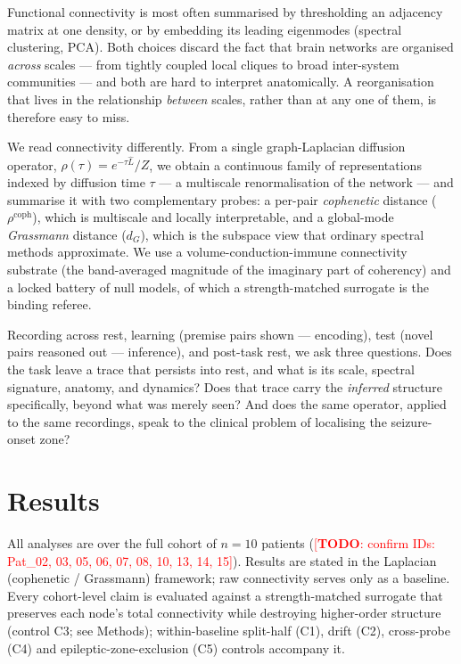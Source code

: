 \documentclass[11pt]{article}
\newcommand{\rhocoph}{\ensuremath{\rho^{\mathrm{coph}}}}
\newcommand{\dG}{\ensuremath{d_{G}}}
\newcommand{\rhat}{\ensuremath{\hat{\rho}(\tau)}}
\newcommand{\TODO}[1]{\textcolor{red}{[\textbf{TODO}: #1]}}
\begin{document}
Functional connectivity is most often summarised by thresholding an adjacency
matrix at one density, or by embedding its leading eigenmodes (spectral
clustering, PCA). Both choices discard the fact that brain networks are organised
\emph{across} scales --- from tightly coupled local cliques to broad
inter-system communities --- and both are hard to interpret anatomically. A
reorganisation that lives in the relationship \emph{between} scales, rather than
at any one of them, is therefore easy to miss.

We read connectivity differently. From a single graph-Laplacian diffusion
operator, $\rhat = e^{-\tau\hat{L}}/Z$, we obtain a continuous family of
representations indexed by diffusion time $\tau$ --- a multiscale renormalisation
of the network --- and summarise it with two complementary probes: a per-pair
\emph{cophenetic} distance (\rhocoph), which is multiscale and locally
interpretable, and a global-mode \emph{Grassmann} distance (\dG), which is the
subspace view that ordinary spectral methods approximate. We use a
volume-conduction-immune connectivity substrate (the band-averaged magnitude of
the imaginary part of coherency) and a locked battery of null models, of which a
strength-matched surrogate is the binding referee.

Recording across rest, learning (premise pairs shown --- encoding), test (novel
pairs reasoned out --- inference), and post-task rest, we ask three questions.
Does the task leave a trace that persists into rest, and what is its scale,
spectral signature, anatomy, and dynamics? Does that trace carry the
\emph{inferred} structure specifically, beyond what was merely seen? And does the
same operator, applied to the same recordings, speak to the clinical problem of
localising the seizure-onset zone?

\section{Results}

All analyses are over the full cohort of $n=10$ patients
(\TODO{confirm IDs: Pat\_02, 03, 05, 06, 07, 08, 10, 13, 14, 15}). Results are
stated in the Laplacian (cophenetic / Grassmann) framework; raw connectivity
serves only as a baseline. Every cohort-level claim is evaluated against a
strength-matched surrogate that preserves each node's total connectivity while
destroying higher-order structure (control C3; see Methods); within-baseline
split-half (C1), drift (C2), cross-probe (C4) and epileptic-zone-exclusion (C5)
controls accompany it.
\end{document}
